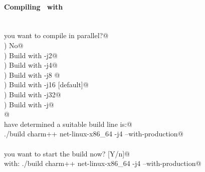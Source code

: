 
\begin{frame}[fragile] 
\secframetitle{\ssInstallCharm}
\framesubtitle{Compiling \charm\ with }
\color{black}
\footnotesize
\ \\
\verb@Do you want to compile in parallel?@ \\
) No@ \\
) Build with -j2@ \\
) Build with -j4@ \\
) Build with -j8 @ \\
) Build with -j16 [default]@ \\
) Build with -j32@ \\
) Build with -j@ \\
\verb@  @
\ \\
\pause
\verb@We have determined a suitable build line is:@ \\
\verb@	./build charm++ net-linux-x86_64  -j4  --with-production@ \\
\ \\
\verb@Do you want to start the build now? [Y/n]@ \pause{}\\
\verb@Building with: ./build charm++ net-linux-x86_64  -j4 --with-production@

\end{frame}



